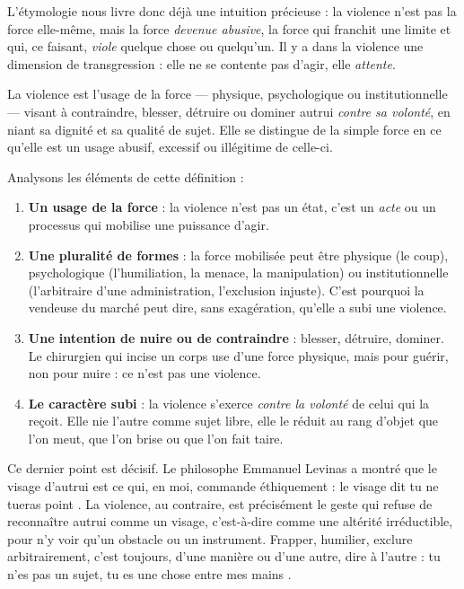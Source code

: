 \documentclass[11pt]{article}
\newcommand{\cle}[1]{{\popxbold\color{popdark}#1}}
\begin{document}
L'étymologie nous livre donc déjà une intuition précieuse : la violence n'est pas la force elle-même, mais la force \emph{devenue abusive}, la force qui franchit une limite et qui, ce faisant, \emph{viole} quelque chose ou quelqu'un. Il y a dans la violence une dimension de transgression : elle ne se contente pas d'agir, elle \emph{attente}.

\begin{definition}[La violence]
La \cle{violence} est l'usage de la force --- physique, psychologique ou institutionnelle --- visant à contraindre, blesser, détruire ou dominer autrui \emph{contre sa volonté}, en niant sa dignité et sa qualité de sujet. Elle se distingue de la simple force en ce qu'elle est un usage abusif, excessif ou illégitime de celle-ci.
\end{definition}

Analysons les éléments de cette définition :

\begin{enumerate}
\item \textbf{Un usage de la force} : la violence n'est pas un état, c'est un \emph{acte} ou un processus qui mobilise une puissance d'agir.
\item \textbf{Une pluralité de formes} : la force mobilisée peut être physique (le coup), psychologique (l'humiliation, la menace, la manipulation) ou institutionnelle (l'arbitraire d'une administration, l'exclusion injuste). C'est pourquoi la vendeuse du marché peut dire, sans exagération, qu'elle a subi une violence.
\item \textbf{Une intention de nuire ou de contraindre} : blesser, détruire, dominer. Le chirurgien qui incise un corps use d'une force physique, mais pour guérir, non pour nuire : ce n'est pas une violence.
\item \textbf{Le caractère subi} : la violence s'exerce \emph{contre la volonté} de celui qui la reçoit. Elle nie l'autre comme sujet libre, elle le réduit au rang d'objet que l'on meut, que l'on brise ou que l'on fait taire.
\end{enumerate}

Ce dernier point est décisif. Le philosophe Emmanuel Levinas a montré que le visage d'autrui est ce qui, en moi, commande éthiquement : le visage dit \guillemotleft tu ne tueras point \guillemotright. La violence, au contraire, est précisément le geste qui refuse de reconnaître autrui comme un visage, c'est-à-dire comme une altérité irréductible, pour n'y voir qu'un obstacle ou un instrument. Frapper, humilier, exclure arbitrairement, c'est toujours, d'une manière ou d'une autre, dire à l'autre : \guillemotleft tu n'es pas un sujet, tu es une chose entre mes mains \guillemotright.
\end{document}
